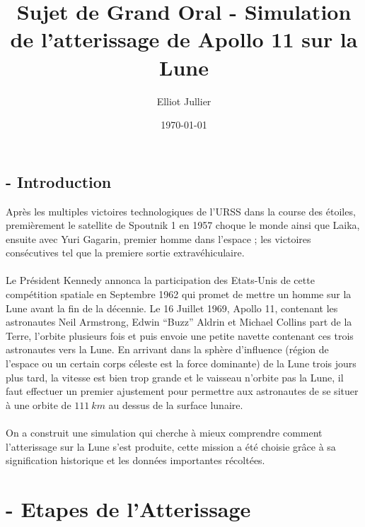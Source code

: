 \documentclass[a4paper, 12pt]{scrartcl}
\begin{document}
\title{Sujet de Grand Oral - Simulation de l'atterissage de Apollo 11 sur la Lune }
\author{Elliot Jullier}
\date{\today}
\maketitle

\tableofcontents

\newpage
{}




\subsection{- Introduction}
Après les multiples victoires technologiques de l'URSS dans la course des étoiles, premièrement
le satellite de Spoutnik 1 en 1957 choque le monde ainsi que Laika, ensuite avec Yuri Gagarin, premier homme dans l'espace ; 
les victoires consécutives tel que la premiere sortie extravéhiculaire. 
\\
\\
Le Président Kennedy annonca la participation des Etats-Unis de cette compétition spatiale en 
Septembre 1962 qui promet de mettre un homme sur la Lune avant la fin de la décennie. 
Le 16 Juillet 1969, Apollo 11, contenant les astronautes Neil Armstrong, Edwin ``Buzz'' Aldrin et Michael Collins
part de la Terre, l'orbite plusieurs fois et puis envoie une petite navette contenant ces trois astronautes vers la Lune.
En arrivant dans la sphère d'influence (région de l'espace ou un certain corps céleste est la force dominante) de la Lune trois jours plus tard, la vitesse est bien trop grande et le vaisseau n'orbite pas la Lune, il faut effectuer un premier ajustement 
pour permettre aux astronautes de se situer à une orbite de $111\ km$ au dessus de la surface lunaire.
\\
\\
On a construit une simulation qui cherche à mieux comprendre comment l'atterissage sur la Lune
s'est produite, cette mission a été choisie grâce à sa signification historique et les
données importantes récoltées. 



\section{- Etapes de l'Atterissage}
\end{document}
